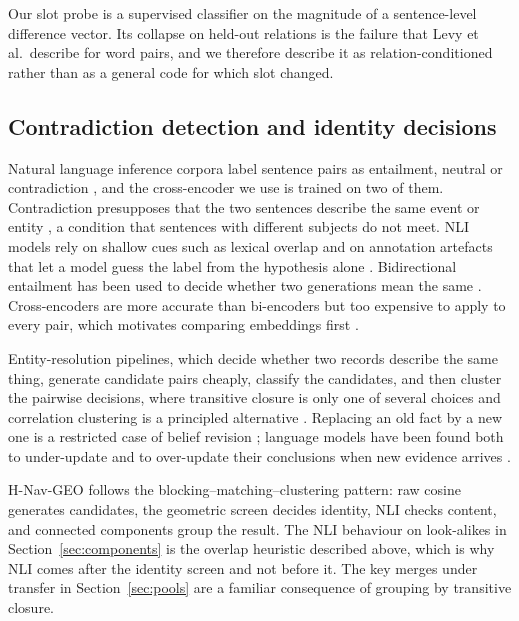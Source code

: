 \documentclass{CUP-JNL-NLP}
\newcommand{\geo}{H-Nav-GEO}
\begin{document}
Our slot probe is a supervised classifier on the magnitude of a sentence-level difference vector. Its collapse on held-out relations is the failure that Levy et al.\ describe for word pairs, and we therefore describe it as relation-conditioned rather than as a general code for which slot changed.

\subsection{Contradiction detection and identity decisions}
\label{sec:related-identity}

Natural language inference corpora label sentence pairs as entailment, neutral or contradiction \citep{bowman2015large,williams2018broad}, and the cross-encoder we use is trained on two of them. Contradiction presupposes that the two sentences describe the same event or entity \citep{demarneffe2008finding}, a condition that sentences with different subjects do not meet. NLI models rely on shallow cues such as lexical overlap \citep{mccoy2019right} and on annotation artefacts that let a model guess the label from the hypothesis alone \citep{gururangan2018annotation,poliak2018hypothesis}. Bidirectional entailment has been used to decide whether two generations mean the same \citep{kuhn2023semantic,farquhar2024semantic}. Cross-encoders are more accurate than bi-encoders but too expensive to apply to every pair, which motivates comparing embeddings first \citep{reimers2019sentencebert}.

Entity-resolution pipelines, which decide whether two records describe the same thing, generate candidate pairs cheaply, classify the candidates, and then cluster the pairwise decisions, where transitive closure is only one of several choices \citep{hassanzadeh2009framework} and correlation clustering is a principled alternative \citep{bansal2004correlation}. Replacing an old fact by a new one is a restricted case of belief revision \citep{alchourron1985logic}; language models have been found both to under-update and to over-update their conclusions when new evidence arrives \citep{wilie2024belief}.

\geo{} follows the blocking--matching--clustering pattern: raw cosine generates candidates, the geometric screen decides identity, NLI checks content, and connected components group the result. The NLI behaviour on look-alikes in Section~\ref{sec:components} is the overlap heuristic described above, which is why NLI comes after the identity screen and not before it. The key merges under transfer in Section~\ref{sec:pools} are a familiar consequence of grouping by transitive closure.
\end{document}
